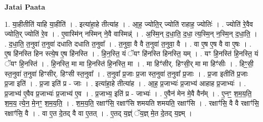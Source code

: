 \documentclass[17pt]{extarticle}
\begin{document}
\textbf{Jatai Paata} \newline

1. या॒हीतीति॑ याहि या॒हीति॑ । . इत्या॑हा॒हे तीत्या॑ह । . आ॒ह॒ ज्योति॒र् ज्योति॑ राहाह॒ ज्योतिः॑ । . ज्योति॑ रे॒वैव ज्योति॒र् ज्योति॑ रे॒व । . ए॒वास्मि॑न् नस्मिन् ने॒वै वास्मिन्न्॑ । . अ॒स्मि॒न् द॒धा॒ति॒ द॒धा॒ त्य॒स्मि॒न् न॒स्मि॒न् द॒धा॒ति॒ । . द॒धा॒ति॒ त॒नुवा॑ त॒नुवा॑ दधाति दधाति त॒नुवा᳚ । . त॒नुवा॒ वै वै त॒नुवा॑ त॒नुवा॒ वै । . वा ए॒ष ए॒ष वै वा ए॒षः । . ए॒ष हि॑नस्ति हिन स्त्ये॒ष ए॒ष हि॑नस्ति । . हि॒न॒स्ति॒ यं ॅयꣳ हि॑नस्ति हिनस्ति॒ यम् । . यꣳ हि॒नस्ति॑ हि॒नस्ति॒ यं ॅयꣳ हि॒नस्ति॑ । . हि॒नस्ति॒ मा मा हि॒नस्ति॑ हि॒नस्ति॒ मा । . मा हिꣳ॑सीर्. हिꣳसी॒र् मा मा हिꣳ॑सीः । . हिꣳ॒॒सी॒ स्त॒नुवा॑ त॒नुवा॑ हिꣳसीर्. हिꣳसी स्त॒नुवा᳚ । . त॒नुवा᳚ प्र॒जाः प्र॒जा स्त॒नुवा॑ त॒नुवा᳚ प्र॒जाः । . प्र॒जा इतीति॑ प्र॒जाः प्र॒जा इति॑ । . प्र॒जा इति॑ प्र - जाः । . इत्या॑हा॒हे तीत्या॑ह । . आ॒ह॒ प्र॒जाभ्यः॑ प्र॒जाभ्य॑ आहाह प्र॒जाभ्यः॑ । . प्र॒जाभ्य॑ ए॒वैव प्र॒जाभ्यः॑ प्र॒जाभ्य॑ ए॒व । . प्र॒जाभ्य॒ इति॑ प्र - जाभ्यः॑ । . ए॒वैन॑ मेन मे॒वै वैन᳚म् । . ए॒नꣳ॒॒ श॒म॒य॒ति॒ श॒म॒य॒ त्ये॒न॒ मे॒नꣳ॒॒ श॒म॒य॒ति॒ । . श॒म॒य॒ति॒ रक्षाꣳ॑सि॒ रक्षाꣳ॑सि शमयति शमयति॒ रक्षाꣳ॑सि । . रक्षाꣳ॑सि॒ वै वै रक्षाꣳ॑सि॒ रक्षाꣳ॑सि॒ वै । . वा ए॒त दे॒तद् वै वा ए॒तत् । . ए॒तद् य॒ज्ञ्ं ॅय॒ज्ञ् मे॒त दे॒तद् य॒ज्ञ्म् । \newline
\end{document}
